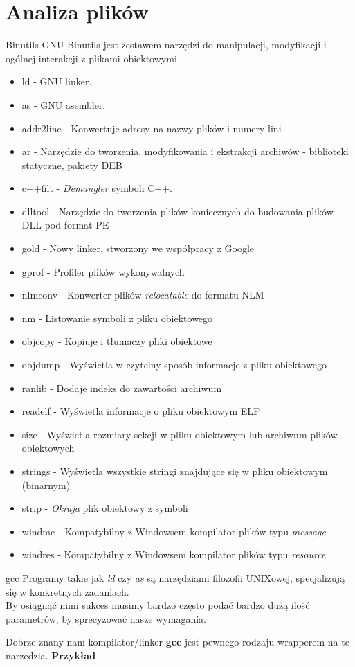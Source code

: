 \section{Analiza plików}
\begin{frame}[allowframebreaks]{Binutils}
  GNU Binutils jest zestawem narzędzi do manipulacji, modyfikacji i ogólnej
  interakcji z plikami obiektowymi
  \begin{itemize}
  \item ld - GNU linker.
  \item as - GNU asembler.
  \item addr2line - Konwertuje adresy na nazwy plików i numery lini
  \item ar - Narzędzie do tworzenia, modyfikowania i ekstrakcji archiwów -
    biblioteki statyczne, pakiety DEB
  \item c++filt - \textit{Demangler} symboli C++.
  \item dlltool - Narzędzie do tworzenia plików koniecznych do budowania plików
    DLL pod format PE
  \item gold - Nowy linker, stworzony we współpracy z Google
  \item gprof - Profiler plików wykonywalnych
  \item nlmconv - Konwerter plików \textit{relocatable} do formatu NLM
  \item nm - Listowanie symboli z pliku obiektowego
  \item objcopy - Kopiuje i tłumaczy pliki obiektowe
  \item objdump - Wyświetla w czytelny sposób informacje z pliku obiektowego
  \item ranlib - Dodaje indeks do zawartości archiwum
  \item readelf - Wyświetla informacje o pliku obiektowym ELF
  \item size - Wyświetla rozmiary sekcji w pliku obiektowym lub archiwum plików
    obiektowych
  \item strings - Wyświetla wszystkie stringi znajdujące się w pliku obiektowym
    (binarnym)
  \item strip - \textit{Okraja} plik obiektowy z symboli
  \item windmc - Kompatybilny z Windowsem kompilator plików typu
    \textit{message}
  \item windres - Kompatybilny z Windowsem kompilator plików typu
    \textit{resource}
  \end{itemize}
\end{frame}
\begin{frame}{gcc}
  Programy takie jak \textit{ld} czy \textit{as} są narzędziami filozofii
  UNIXowej, specjalizują się w konkretnych zadaniach.\\

  By osiągnąć nimi sukces musimy bardzo często podać bardzo dużą ilość
  parametrów, by sprecyzować nasze wymagania.

  Dobrze znany nam kompilator/linker \textbf{gcc} jest pewnego rodzaju wrapperem
  na te narzędzia. \textbf{Przykład}
\end{frame}
